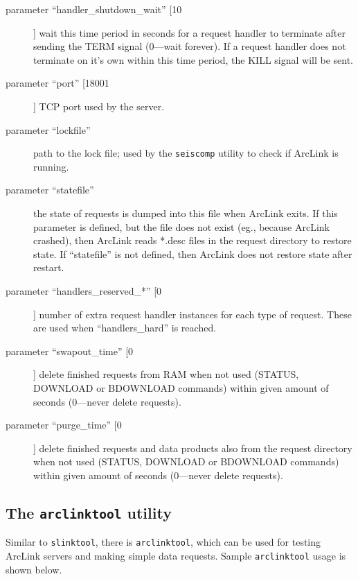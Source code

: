 \documentclass[11pt,a4paper,titlepage]{article}
\newcommand{\cmd}[1]{\texttt{#1}}
\newcommand{\dfl}[1]{[#1]}
\begin{document}
\begin{description}
\item[parameter ``handler\_shutdown\_wait'' \dfl{10}] wait this time period
in seconds for a request handler to terminate after sending the TERM signal
(0---wait forever). If a request handler does not terminate on it's own
within this time period, the KILL signal will be sent.

\item[parameter ``port'' \dfl{18001}] TCP port used by the server.

\item[parameter ``lockfile''] path to the lock file; used by the
\cmd{seiscomp} utility to check if ArcLink is running.

\item[parameter ``statefile''] the state of requests is dumped into this
file when ArcLink exits. If this parameter is defined, but the file does not
exist (eg., because ArcLink crashed), then ArcLink reads *.desc files in
the request directory to restore state. If ``statefile'' is not defined,
then ArcLink does not restore state after restart.

\item[parameter ``handlers\_reserved\_*'' \dfl{0}] number of extra request
handler instances for each type of request. These are used when
``handlers\_hard'' is reached.

\item[parameter ``swapout\_time'' \dfl{0}] delete finished requests from
RAM when not used (STATUS, DOWNLOAD or BDOWNLOAD commands) within given
amount of seconds (0---never delete requests).

\item[parameter ``purge\_time'' \dfl{0}] delete finished requests and data
products also from the request directory when not used (STATUS, DOWNLOAD or
BDOWNLOAD commands) within given amount of seconds (0---never delete
requests).

\end{description}


\subsection{The \cmd{arclinktool} utility}\label{arclinktool}

Similar to \cmd{slinktool}, there is \cmd{arclinktool}, which can be used
for testing ArcLink servers and making simple data requests. Sample
\cmd{arclinktool} usage is shown below.
\end{document}
